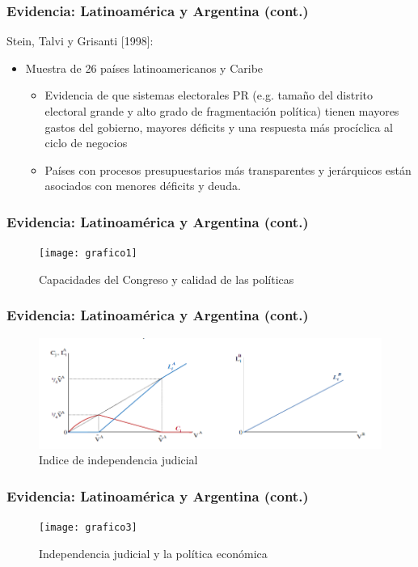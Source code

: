 \documentclass[handout,final,xcolor=dvipsnames]{beamer}
\begin{document}
\begin{frame}\frametitle{Evidencia: Latinoamérica y Argentina (cont.)}
Stein, Talvi y Grisanti [1998]: \medskip 
\begin{itemize} \itemsep 15pt
\item Muestra de 26 países latinoamericanos y Caribe \medskip 
\begin{itemize} \itemsep 10pt
\item Evidencia de que sistemas electorales PR (e.g. tamaño del distrito electoral grande
y alto grado de fragmentación política) tienen mayores gastos del gobierno, mayores déficits y una respuesta más procíclica al ciclo de negocios
\item Países con procesos presupuestarios más transparentes y jerárquicos están asociados con menores déficits y deuda.
\end{itemize}
\end{itemize}
\end{frame}



\begin{frame}\frametitle{Evidencia: Latinoamérica y Argentina (cont.)}
  \begin{figure}[htbp]
    \centering
    \texttt{[image: grafico1]}
\caption{Capacidades del Congreso y calidad de las políticas}
  \end{figure}
\end{frame}



\begin{frame}\frametitle{Evidencia: Latinoamérica y Argentina (cont.)}
\begin{figure}[htbp]
    \centering
    \includegraphics[scale=0.3]{grafico2}
\caption{Indice de independencia judicial}
  \end{figure}
\end{frame}


\begin{frame}\frametitle{Evidencia: Latinoamérica y Argentina (cont.)}
\begin{figure}[htbp]
    \centering
    \texttt{[image: grafico3]}
\caption{Independencia judicial y la política económica}
  \end{figure}
\end{frame}
\end{document}
